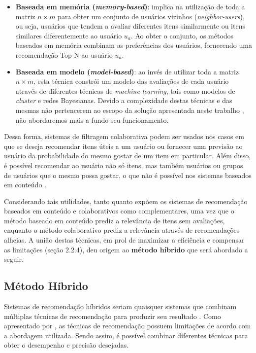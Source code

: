 \begin{itemize}
	\item \textbf{Baseada em memória (\textit{memory-based})}: implica na utilização de toda a matriz $n \times m$ para obter um conjunto de usuários vizinhos (\textit{neighbor-users}), ou seja, usuários que tendem a avaliar diferentes itens similarmente ou itens similares diferentemente ao usuário $u_{a}$. Ao obter o conjunto, os métodos baseados em memória combinam as preferências dos usuários, fornecendo uma recomendação Top-N ao usuário $u_{a}$.

	\item \textbf{Baseada em modelo (\textit{model-based})}: ao invés de utilizar toda a matriz $n \times m$, esta técnica constrói um modelo das avaliações de cada usuário através de diferentes técnicas de \textit{machine learning}, tais como modelos de \textit{cluster} e redes Bayesianas. Devido a complexidade destas técnicas e das mesmas não pertencerem ao escopo da solução apresentada neste trabalho , não abordaremos mais a fundo seu funcionamento.
\end{itemize}

Dessa forma, sistemas de filtragem colaborativa podem ser usados nos casos em que se deseja recomendar itens úteis a um usuário ou fornecer uma previsão ao usuário da probabilidade do mesmo gostar de um item em particular. Além disso, é possível recomendar ao usuário não só itens, mas também usuários ou grupos de usuários que o mesmo possa gostar, o que não é possível nos sistemas baseados em conteúdo \cite{schafer2007collaborative}.

Considerando tais utilidades, tanto  quanto  expõem os sistemas de recomendação baseados em conteúdo e colaborativos como complementares, uma vez que o método baseado em conteúdo prediz a relevância de itens sem avaliações, enquanto o método colaborativo prediz a relevância através de recomendações alheias. A união destas técnicas, em prol de maximizar a eficiência e compensar as limitações (seção 2.2.4), deu origem ao \textbf{método híbrido} que será abordado a seguir.

\subsection{Método Híbrido}

Sistemas de recomendação híbridos seriam quaisquer sistemas que combinam múltiplas técnicas de recomendação para produzir seu resultado \cite{burke2002hybrid, burke2007hybrid}. Como apresentado por , as técnicas de recomendação possuem limitações de acordo com a abordagem utilizada. Sendo assim, é possível combinar diferentes técnicas para obter o desempenho e precisão desejadas.

